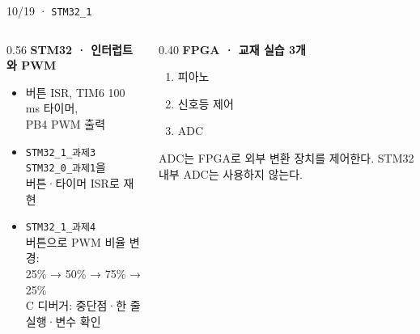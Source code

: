 \documentclass[aspectratio=43,11pt,t]{beamer}
\newcommand{\lab}[1]{\texttt{STM32\_#1}}
\newcommand{\task}[2]{\texttt{STM32\_#1\_과제#2}}
\begin{document}
\begin{frame}{10/19 · \lab{1}}
\begin{columns}[T]
\begin{column}{0.56\textwidth}
\textbf{\color{UOSBlue}STM32 · 인터럽트와 PWM}
\begin{itemize}\setlength{\itemsep}{0.12cm}
\item 버튼 ISR, TIM6 100 ms 타이머,\\PB4 PWM 출력
\item \task{1}{3}\\\task{0}{1}을\\버튼·타이머 ISR로 재현
\item \task{1}{4}\\버튼으로 PWM 비율 변경:\\25\% → 50\% → 75\% → 25\%\\{\small C 디버거: 중단점·한 줄 실행·변수 확인}
\end{itemize}
\end{column}
\begin{column}{0.40\textwidth}
\textbf{\color{UOSBlue}FPGA · 교재 실습 3개}
\begin{enumerate}\setlength{\itemsep}{0.15cm}
\item 피아노
\item 신호등 제어
\item ADC
\end{enumerate}
\vspace{0.18cm}
\small ADC는 FPGA로 외부 변환 장치를 제어한다. STM32 내부 ADC는 사용하지 않는다.
\end{column}
\end{columns}
\end{frame}
\end{document}
